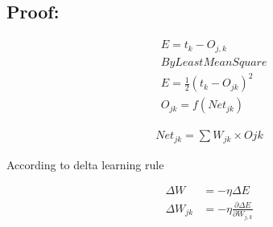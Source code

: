 \subsection{Proof:}

\begin{align*}
&E = t_k - O_{j,k} \\
&By Least Mean Square \\
&E = \frac{1}{2}(t_k-O_{jk})^2 \\
&O_{jk} = f(Net_{jk})
\end{align*}

\begin{align}
Net_{jk} = \sum W_{jk} \times O{jk}
\end{align}

According to delta learning rule

\begin{align*}
\Delta W &= - \eta \Delta E \\
\Delta W_{jk} &= - \eta \frac{\partial \Delta E}{\partial W_{j,k}} \\
\end{align*}

